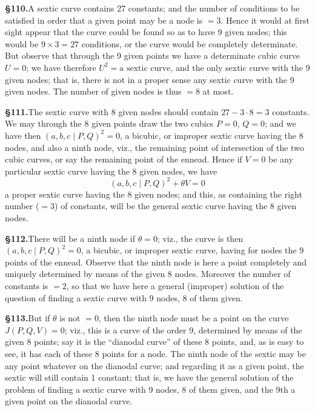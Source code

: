 \documentclass[11pt,a4paper]{article}
\begin{document}
\textbf{\S 110.}\quad A sextic curve contains 27 constants; and the number of conditions to be satisfied in order that a given point may be a node is $= 3$. Hence it would at first sight appear that the curve could be found so as to have 9 given nodes; this would be $9 \times 3 = 27$ conditions, or the curve would be completely determinate. But observe that through the 9 given points we have a determinate cubic curve $U = 0$; we have therefore $U^2 = \text{a sextic curve}$, and the only sextic curve with the 9 given nodes; that is, there is not in a proper sense any sextic curve with the 9 given nodes. The number of given nodes is thus $= 8$ at most.

\textbf{\S 111.}\quad The sextic curve with 8 given nodes should contain $27 - 3 \cdot 8 = 3$ constants. We may through the 8 given points draw the two cubics $P = 0$, $Q = 0$; and we have then $(a, b, c \mid P, Q)^2 = 0$, a bicubic, or improper sextic curve having the 8 nodes, and also a ninth node, viz., the remaining point of intersection of the two cubic curves, or say the remaining point of the ennead. Hence if $V = 0$ be any particular sextic curve having the 8 given nodes, we have
\[
(a, b, c \mid P, Q)^2 + \theta V = 0
\]
a proper sextic curve having the 8 given nodes; and this, as containing the right number ($= 3$) of constants, will be the general sextic curve having the 8 given nodes.

\textbf{\S 112.}\quad There will be a ninth node if $\theta = 0$; viz., the curve is then $(a, b, c \mid P, Q)^2 = 0$, a bicubic, or improper sextic curve, having for nodes the 9 points of the ennead. Observe that the ninth node is here a point completely and uniquely determined by means of the given 8 nodes. Moreover the number of constants is $= 2$, so that we have here a general (improper) solution of the question of finding a sextic curve with 9 nodes, 8 of them given.

\textbf{\S 113.}\quad But if $\theta$ is not $= 0$, then the ninth node must be a point on the curve $J(P, Q, V) = 0$; viz., this is a curve of the order 9, determined by means of the given 8 points; say it is the ``dianodal curve'' of these 8 points, and, as is easy to see, it has each of these 8 points for a node. The ninth node of the sextic may be any point whatever on the dianodal curve; and regarding it as a given point, the sextic will still contain 1 constant; that is, we have the general solution of the problem of finding a sextic curve with 9 nodes, 8 of them given, and the 9th a given point on the dianodal curve.
\end{document}
